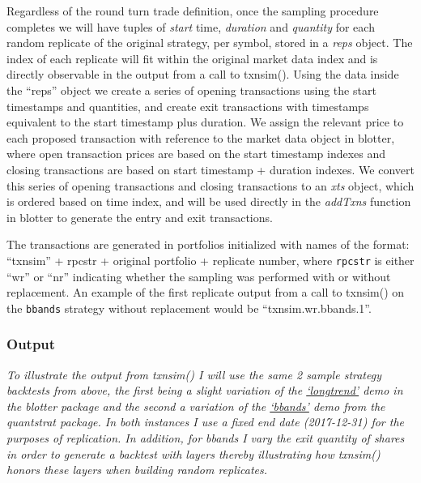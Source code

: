 Regardless of the round turn trade definition, once the sampling
procedure completes we will have tuples of \emph{start} time,
\emph{duration} and \emph{quantity} for each random replicate of the
original strategy, per symbol, stored in a \emph{reps} object. The index
of each replicate will fit within the original market data index and is
directly observable in the output from a call to txnsim(). Using the
data inside the ``reps'' object we create a series of opening
transactions using the start timestamps and quantities, and create exit
transactions with timestamps equivalent to the start timestamp plus
duration. We assign the relevant price to each proposed transaction with
reference to the market data object in blotter, where open transaction
prices are based on the start timestamp indexes and closing transactions
are based on start timestamp + duration indexes. We convert this series
of opening transactions and closing transactions to an \emph{xts}
object, which is ordered based on time index, and will be used directly
in the \emph{addTxns} function in blotter to generate the entry and exit
transactions.

The transactions are generated in portfolios initialized with names of
the format: ``txnsim'' + rpcstr + original portfolio + replicate number,
where \texttt{rpcstr} is either ``wr'' or ``nr'' indicating whether the
sampling was performed with or without replacement. An example of the
first replicate output from a call to txnsim() on the \texttt{bbands}
strategy without replacement would be ``txnsim.wr.bbands.1''.

\hypertarget{output}{%
\subsubsection{Output}\label{output}}

\emph{To illustrate the output from txnsim() I will use the same 2
sample strategy backtests from above, the first being a slight variation
of the
\href{https://github.com/braverock/blotter/blob/master/demo/longtrend.R}{`longtrend'}
demo in the blotter package and the second a variation of the
\href{https://github.com/braverock/quantstrat/blob/master/demo/bbands.R}{`bbands'}
demo from the quantstrat package. In both instances I use a fixed end
date (2017-12-31) for the purposes of replication. In addition, for
bbands I vary the exit quantity of shares in order to generate a
backtest with layers thereby illustrating how txnsim() honors these
layers when building random replicates.}

